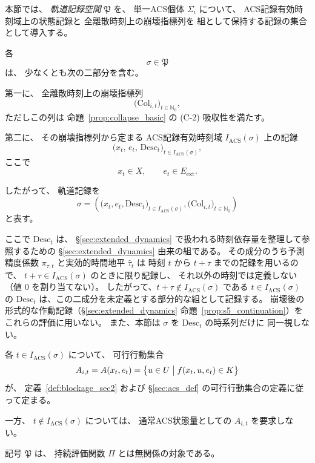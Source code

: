 \begin{definition}
\label{def:trajectory_space}
本節では、
\emph{軌道記録空間}
$\mathfrak{P}$ を、
単一ACS個体 $\Sigma_i$ について、
ACS記録有効時刻域上の状態記録と
全離散時刻上の崩壊指標列を
組として保持する記録の集合として導入する。

各
\[
  \sigma\in\mathfrak{P}
\]
は、
少なくとも次の二部分を含む。

第一に、
全離散時刻上の崩壊指標列
\[
  \bigl(
    \mathrm{Col}_{i,t}
  \bigr)_{t\in\mathbb{N}_0},
\]
ただしこの列は
命題~\ref{prop:collapse_basic} の
(C-2) 吸収性を満たす。

第二に、
その崩壊指標列から定まる
ACS記録有効時刻域
$I_{\mathrm{ACS}}(\sigma)$
上の記録
\[
  \bigl(
    x_t,\,
    e_t,\,
    \mathrm{Desc}_t
  \bigr)_{t\in I_{\mathrm{ACS}}(\sigma)},
\]
ここで
\[
  x_t\in X,
  \qquad
  e_t\in E_{\mathrm{ext}}.
\]

したがって、
軌道記録を
\[
  \sigma
  =
  \left(
    \bigl(
      x_t,e_t,\mathrm{Desc}_t
    \bigr)_{t\in I_{\mathrm{ACS}}(\sigma)},
    \bigl(
      \mathrm{Col}_{i,t}
    \bigr)_{t\in\mathbb{N}_0}
  \right)
\]
と表す。

ここで
$\mathrm{Desc}_t$ は、
\S\ref{sec:extended_dynamics}
で扱われる時刻依存量を整理して参照するための
\S\ref{sec:extended_dynamics} 由来の組である。
その成分のうち予測精度係数 $\pi_{\tau,t}$ と実効的時間地平 $\widehat\tau_t$ は
時刻 $t$ から $t+\tau$ までの記録を用いるので、
$t+\tau\in I_{\mathrm{ACS}}(\sigma)$ のときに限り記録し、
それ以外の時刻では定義しない（値 $0$ を割り当てない）。
したがって、$t+\tau\notin I_{\mathrm{ACS}}(\sigma)$ である $t\in I_{\mathrm{ACS}}(\sigma)$ の
$\mathrm{Desc}_t$ は、この二成分を未定義とする部分的な組として記録する。
崩壊後の形式的な作動記録（\S\ref{sec:extended_dynamics} 命題~\ref{prop:s5_continuation}）を
これらの評価に用いない。
また、本節は
$\sigma$ を
$\mathrm{Desc}_t$ の時系列だけに
同一視しない。

各
$t\in I_{\mathrm{ACS}}(\sigma)$
について、
可行行動集合
\[
  A_{i,t}
  =
  A(x_t,e_t)
  =
  \bigl\{
    u\in U
    \bigm|
    f(x_t,u,e_t)\in K
  \bigr\}
\]
が、
定義~\ref{def:blockage_sec2}
および
\S\ref{sec:acs_def}
の可行行動集合の定義に従って定まる。

一方、
$t\notin I_{\mathrm{ACS}}(\sigma)$
については、
通常ACS状態量としての
$A_{i,t}$ を要求しない。

記号
$\mathfrak{P}$ は、
持続評価関数
$\Pi$
とは無関係の対象である。
\end{definition}

